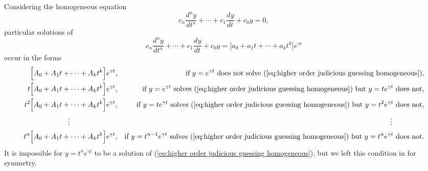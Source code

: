 \documentclass{myart}
\newcommand{\eq}[1]{(\ref{eq:#1})}
\newcommand{\deriv}[3][]{\frac{d^{#1}#2}{d#3^{#1}}}
\begin{document}
Considering the homogeneous equation
\begin{equation}
  \label{eq:higher order judicious guessing homogeneous}
  c_n \deriv[n]{y}{t} + \cdots + c_1 \deriv{y}{t} + c_0 y = 0,
\end{equation}
particular solutions of
\begin{equation*}
    c_n \deriv[n]{y}{t} + \cdots + c_1 \deriv{y}{t} + c_0 y
  = \Big[a_0 + a_1 t + \cdots + a_k t^k\Big]e^{\gamma t}
\end{equation*}
occur in the forms
\begin{align*}
        \Big[A_0 + A_1 t + \cdots + A_k t^k\Big]e^{\gamma t},
  && \text{if $y = e^{\gamma t}$ does not solve
           \eq{higher order judicious guessing homogeneous}}, \\
     t  \Big[A_0 + A_1 t + \cdots + A_k t^k\Big]e^{\gamma t},
  && \text{if $y = e^{\gamma t}$ solves
           \eq{higher order judicious guessing homogeneous}
           but $y = te^{\gamma t}$ does not}, \\
     t^2\Big[A_0 + A_1 t + \cdots + A_k t^k\Big]e^{\gamma t},
  && \text{if $y = te^{\gamma t}$ solves
           \eq{higher order judicious guessing homogeneous}
           but $y = t^2e^{\gamma t}$ does not}, \\
  \vdots \hspace{66.25pt} && \vdots \hspace{44.5pt} \\
     t^n\Big[A_0 + A_1 t + \cdots + A_k t^k\Big]e^{\gamma t},
  && \text{if $y = t^{n-1} e^{\gamma t}$ solves
           \eq{higher order judicious guessing homogeneous}
           but $y = t^n e^{\gamma t}$ does not}. \\
\end{align*}
It is impossible for $y = t^n e^{\gamma t}$ to be a solution of
\eq{higher order judicious guessing homogeneous}, but we left this
condition in for symmetry.
\end{document}
